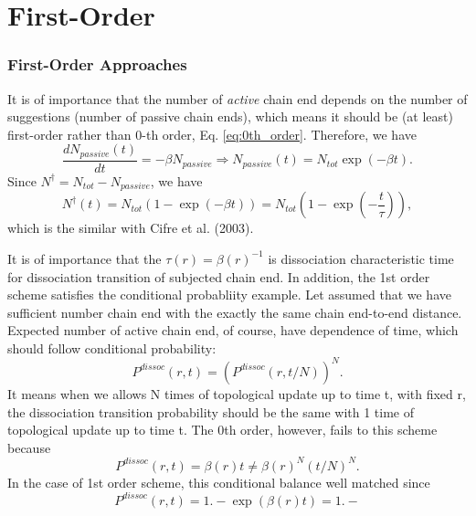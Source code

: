 \documentclass[slidestop, compress, mathserif]{beamer}
\begin{document}
\section{First-Order}
\begin{frame}
  \frametitle{First-Order Approaches}
  It is of importance that the number of \textit{active} chain end depends on the number of suggestions (number of passive chain ends), which means it should be (at least) first-order rather than 0-th order, Eq. \eqref{eq:0th_order}. Therefore, we have
  \begin{equation}
    \frac{d N_{passive}(t)}{dt} = -\beta N_{passive} \Rightarrow N_{passive}(t) = N_{tot}\exp\left(-\beta t\right).
  \end{equation}
  Since $N^\dagger = N_{tot} - N_{passive}$, we have
  \begin{equation}
    N^\dagger(t) = N_{tot}\left(1 - \exp\left(-\beta t\right)\right) = N_{tot}\left(1 - \exp\left(-\frac{t}{\tau}\right)\right),
  \end{equation}
  which is the similar with Cifre et al. (2003).
\end{frame}

\begin{frame}
  It is of importance that the $\tau(r) = \beta(r)^{-1}$ is dissociation characteristic time for dissociation transition of subjected chain end. In addition, the 1st order scheme satisfies the conditional probabliity example. Let assumed that we have sufficient number chain end with the exactly the same chain end-to-end distance. Expected number of active chain end, of course, have dependence of time, which should follow conditional probability:
  \begin{equation}
    P^{dissoc}(r, t) = (P^{dissoc}(r, t/N))^{N}.
  \end{equation}
  It means when we allows N times of topological update up to time t, with fixed r, the dissociation transition probability should be the same with 1 time of topological update up to time t. The 0th order, however, fails to this scheme because
  \begin{equation}
    P^{dissoc}(r, t) = \beta(r)t \neq \beta(r)^{N}(t/N)^{N}.
  \end{equation}
  In the case of 1st order scheme, this conditional balance well matched since
  \begin{equation}
    P^{dissoc}(r, t) = 1. - \exp(\beta(r) t) = 1. - 
  \end{equation}
\end{frame}
\end{document}
